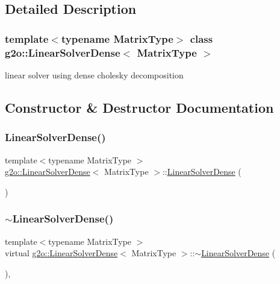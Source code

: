 \subsection{Detailed Description}
\subsubsection*{template$<$typename Matrix\+Type$>$\newline
class g2o\+::\+Linear\+Solver\+Dense$<$ Matrix\+Type $>$}

linear solver using dense cholesky decomposition 

\subsection{Constructor \& Destructor Documentation}
\mbox{\label{classg2o_1_1_linear_solver_dense_a25d8767ad60e944d8518348a136830da}} 
\subsubsection{\texorpdfstring{Linear\+Solver\+Dense()}{LinearSolverDense()}}
{\footnotesize\ttfamily template$<$typename Matrix\+Type $>$ \\
\mbox{\hyperlink{classg2o_1_1_linear_solver_dense}{g2o\+::\+Linear\+Solver\+Dense}}$<$ Matrix\+Type $>$\+::\mbox{\hyperlink{classg2o_1_1_linear_solver_dense}{Linear\+Solver\+Dense}} (\begin{DoxyParamCaption}{ }\end{DoxyParamCaption})\hspace{0.3cm}{\ttfamily [inline]}}

\mbox{\label{classg2o_1_1_linear_solver_dense_a2b3cbb77fa958bf322b98e38ec3e29c2}} 
\subsubsection{\texorpdfstring{$\sim$\+Linear\+Solver\+Dense()}{~LinearSolverDense()}}
{\footnotesize\ttfamily template$<$typename Matrix\+Type $>$ \\
virtual \mbox{\hyperlink{classg2o_1_1_linear_solver_dense}{g2o\+::\+Linear\+Solver\+Dense}}$<$ Matrix\+Type $>$\+::$\sim$\mbox{\hyperlink{classg2o_1_1_linear_solver_dense}{Linear\+Solver\+Dense}} (\begin{DoxyParamCaption}{ }\end{DoxyParamCaption})\hspace{0.3cm}{\ttfamily [inline]}, {\ttfamily [virtual]}}



